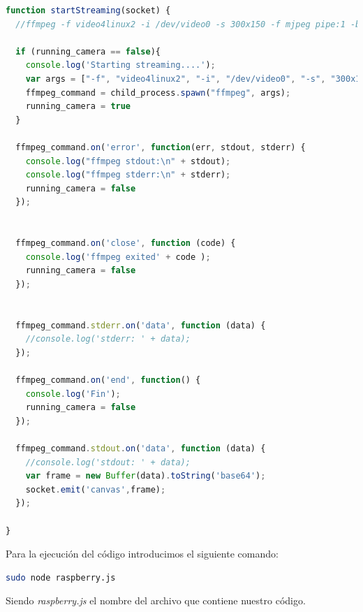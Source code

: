 \begin{lstlisting}[language=JavaScript]
function startStreaming(socket) {
  //ffmpeg -f video4linux2 -i /dev/video0 -s 300x150 -f mjpeg pipe:1 -b:v 28k -bufsize 28k

  if (running_camera == false){
    console.log('Starting streaming....');
    var args = ["-f", "video4linux2", "-i", "/dev/video0", "-s", "300x150","-f","mjpeg", "pipe:1", "-b:v 28k", "-bufsize 28k"]
    ffmpeg_command = child_process.spawn("ffmpeg", args);
    running_camera = true
  }

  ffmpeg_command.on('error', function(err, stdout, stderr) {
    console.log("ffmpeg stdout:\n" + stdout);
    console.log("ffmpeg stderr:\n" + stderr);
    running_camera = false
  });


  ffmpeg_command.on('close', function (code) {
    console.log('ffmpeg exited' + code );
    running_camera = false
  });


  ffmpeg_command.stderr.on('data', function (data) {
    //console.log('stderr: ' + data);
  });

  ffmpeg_command.on('end', function() {
    console.log('Fin');
    running_camera = false
  });

  ffmpeg_command.stdout.on('data', function (data) {
    //console.log('stdout: ' + data);
    var frame = new Buffer(data).toString('base64');
    socket.emit('canvas',frame);
  });

}

\end{lstlisting}

Para la ejecución del código introducimos el siguiente comando:\\

\begin{lstlisting}[language=bash]
  sudo node raspberry.js
\end{lstlisting}

Siendo \emph{raspberry.js} el nombre del archivo que contiene nuestro código.\\

